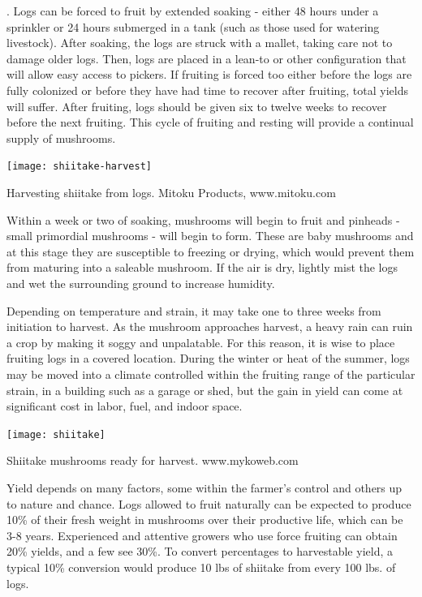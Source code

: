 \documentclass{tufte-handout}
\begin{document}
. 
Logs can be forced to fruit by extended soaking - either 48 hours under a sprinkler or 24 hours submerged in a tank (such as those used for watering livestock). 
After soaking, the logs are struck with a mallet,  taking care not to damage older logs. 
Then, logs are placed in a lean-to or other configuration that will allow easy access to pickers.
If fruiting is forced too either before the logs are fully colonized or before they have had time to recover after fruiting, total yields will suffer. 
After fruiting, logs should be given six to twelve weeks to recover before the next fruiting. 
This cycle of fruiting and resting will provide a continual supply of mushrooms.

\begin{marginfigure}
\texttt{[image: shiitake-harvest]}
\caption{Harvesting shiitake from logs. Mitoku Products, www.mitoku.com}
\end{marginfigure}

Within a week or two of soaking, mushrooms will begin to fruit and pinheads - small primordial mushrooms - will begin to form. These are baby mushrooms and at this stage they are susceptible to freezing or drying, which would prevent them from maturing into a saleable mushroom. 
If the air is dry, lightly mist the logs and wet the surrounding ground to increase humidity.

Depending on temperature and strain, it may take one to three weeks from initiation to harvest. 
As the mushroom approaches harvest, a heavy rain can ruin a crop by making it soggy and unpalatable. 
For this reason, it is wise to place fruiting logs in a covered location. 
During the winter or heat of the summer, logs may be moved into a climate controlled within the fruiting range of the particular strain, in a building such as a garage or shed, but the gain in yield can come at significant cost in labor, fuel, and indoor space.

\begin{marginfigure}
\texttt{[image: shiitake]}
\caption{Shiitake mushrooms ready for harvest. www.mykoweb.com}
\end{marginfigure}


Yield depends on many factors, some within the farmer’s control and others up to nature and chance. 
Logs allowed to fruit naturally can be expected to produce 10\% of their fresh weight in mushrooms over their productive life, which can be 3-8 years. 
Experienced and attentive growers who use force fruiting can obtain 20\% yields, and a few see 30\%. 
To convert percentages to harvestable yield, a typical 10\% conversion would produce 10 lbs of shiitake from every 100 lbs. of logs.
\end{document}
